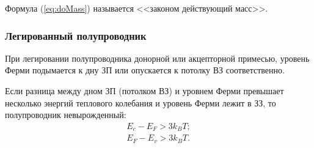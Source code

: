 Формула (\ref{eq:doMass}) называется <<законом действующий масс>>.

\subsubsection{Легированный полупроводник}
При легировании полупроводника донорной или акцепторной примесью, уровень Ферми подымается к дну ЗП или опускается к потолку ВЗ соответственно.

Если разница между дном ЗП (потолком ВЗ) и уровнем Ферми превышает несколько энергий теплового колебания и уровень Ферми лежит в ЗЗ, то полупроводник невырожденный:
\begin{gather}
 	E_{c} - E_{F} > 3k_{B}T;\\
 	E_{F} - E_{v} > 3k_{B}T.
\end{gather} 